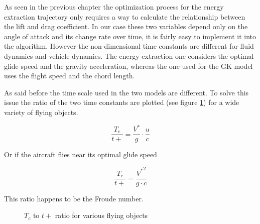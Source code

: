 \par As seen in the previous chapter the optimization process for the energy extraction trajectory only requires a way to calculate the relationship between the lift and drag coefficient.
In our case these two variables depend only on the angle of attack and its change rate over time, it is fairly easy to implement it into the algorithm.
However the non-dimensional time constants are different for fluid dynamics and vehicle dynamics.
The energy extraction one considers the optimal glide speed and the gravity acceleration, whereas the one used for the GK model uses the flight speed and the chord length.

As said before the time scale used in the two models are different.
To solve this issue the ratio of the two time constants are plotted (see figure \ref{fig:T_t+_ratio}) for a wide variety of flying objects.

\begin{equation}
  \frac{T_c}{t+}=\frac{V^*}{g} \cdot \frac{u}{c}
  \label{eqn:T_t+}
\end{equation}

Or if the aircraft flies near its optimal glide speed

\begin{equation}
  \frac{T_c}{t+}=\frac{{V^*}^2}{g \cdot c}
  \label{eqn:T_t+_ratio}
\end{equation}

This ratio happens to be the Froude number.

\begin{figure}[ht]
  \begin{center}
  \end{center}
  \caption{$T_c$ to $t+$ ratio for various flying objects}
  \label{fig:T_t+_ratio}
\end{figure}

